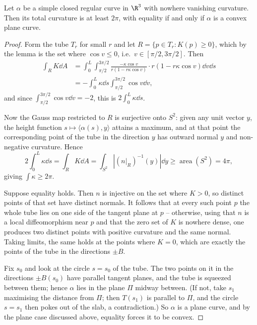 \begin{theorem}[Fenchel]
    Let $\alpha$ be a simple closed regular curve in $\R^3$ with nowhere vanishing curvature. Then its total curvature is at least $2\pi$, with equality if and only if $\alpha$ is a convex plane curve.
\end{theorem}
\begin{proof}
    Form the tube $T_r$ for small $r$ and let $R = \{p \in T_r : K(p) \geq 0\}$, which by the lemma is the set where $\cos v \leq 0$, i.e.\ $v \in [\pi/2, 3\pi/2]$. Then
    $$
    \begin{aligned}
    \int_R K \dd A &= \int_0^L\int_{\pi/2}^{3\pi/2} \frac{-\kappa\cos v}{r(1-r\kappa\cos v)}\cdot r\left(1-r\kappa\cos v\right)\dd v \dd s \\
    &= -\int_0^L\kappa \dd s\int_{\pi/2}^{3\pi/2}\cos v \dd v,
    \end{aligned}
    $$
    and since $\int_{\pi/2}^{3\pi/2}\cos v \dd v = -2$, this is $2\int_0^L\kappa \dd s$.

    Now the Gauss map restricted to $R$ is surjective onto $S^2$: given any unit vector $y$, the height function $s \mapsto \langle \alpha(s), y\rangle$ attains a maximum, and at that point the corresponding point of the tube in the direction $y$ has outward normal $y$ and non-negative curvature. Hence
    $$
    2\int_0^L\kappa\dd s = \int_R K \dd A = \int_{S^2}\left|\left(\left.n\right|_R\right)^{-1}(y)\right|\dd y \geq \operatorname{area}(S^2) = 4\pi,
    $$
    giving $\int\kappa \geq 2\pi$.

    Suppose equality holds. Then $n$ is injective on the set where $K > 0$, so distinct points of that set have distinct normals. It follows that at every such point $p$ the whole tube lies on one side of the tangent plane at $p$ -- otherwise, using that $n$ is a local diffeomorphism near $p$ and that the zero set of $K$ is nowhere dense, one produces two distinct points with positive curvature and the same normal. Taking limits, the same holds at the points where $K = 0$, which are exactly the points of the tube in the directions $\pm B$.

    Fix $s_0$ and look at the circle $s = s_0$ of the tube. The two points on it in the directions $\pm B(s_0)$ have parallel tangent planes, and the tube is squeezed between them; hence $\alpha$ lies in the plane $\Pi$ midway between. (If not, take $s_1$ maximising the distance from $\Pi$; then $T(s_1)$ is parallel to $\Pi$, and the circle $s = s_1$ then pokes out of the slab, a contradiction.) So $\alpha$ is a plane curve, and by the plane case discussed above, equality forces it to be convex.
\end{proof}

